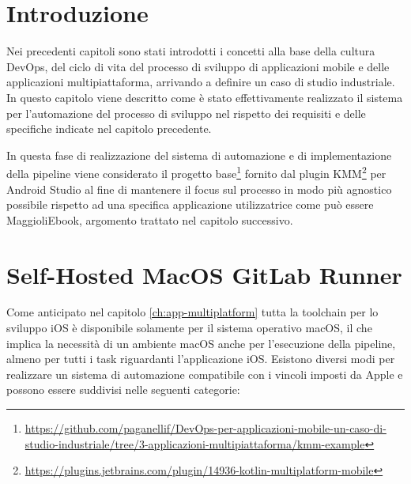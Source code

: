 
\section{Introduzione}
Nei precedenti capitoli sono stati introdotti i concetti alla base della cultura DevOps, del ciclo di vita del processo di sviluppo di applicazioni mobile e delle applicazioni multipiattaforma, arrivando a definire un caso di studio industriale. In questo capitolo viene descritto come è stato effettivamente realizzato il sistema per l'automazione del processo di sviluppo nel rispetto dei requisiti e delle specifiche indicate nel capitolo precedente.

In questa fase di realizzazione del sistema di automazione e di implementazione della pipeline viene considerato il progetto base\footnote{\href{https://github.com/paganellif/DevOps-per-applicazioni-mobile-un-caso-di-studio-industriale/tree/3-applicazioni-multipiattaforma/kmm-example}{https://github.com/paganellif/DevOps-per-applicazioni-mobile-un-caso-di-studio-industriale/tree/3-applicazioni-multipiattaforma/kmm-example}} fornito dal plugin KMM\footnote{\href{https://plugins.jetbrains.com/plugin/14936-kotlin-multiplatform-mobile}{https://plugins.jetbrains.com/plugin/14936-kotlin-multiplatform-mobile}} per Android Studio al fine di mantenere il focus sul processo in modo più agnostico possibile rispetto ad una specifica applicazione utilizzatrice come può essere MaggioliEbook, argomento trattato nel capitolo successivo.

\section{Self-Hosted MacOS GitLab Runner}
Come anticipato nel capitolo \ref{ch:app-multiplatform} tutta la toolchain per lo sviluppo iOS è disponibile solamente per il sistema operativo macOS, il che implica la necessità di un ambiente macOS anche per l'esecuzione della pipeline, almeno per tutti i task riguardanti l'applicazione iOS. Esistono diversi modi per realizzare un sistema di automazione compatibile con i vincoli imposti da Apple e possono essere suddivisi nelle seguenti categorie:

